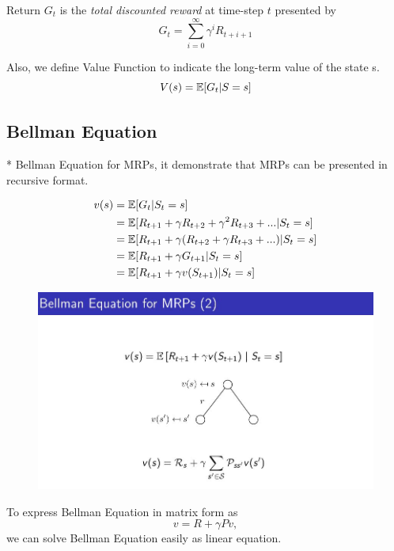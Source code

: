 \documentclass[10pt, a4paper, twocolumn]{article} %
\begin{document}
Return $G_{t}$ is the \textsl{total discounted reward} at time-step $t$ presented by $$G_{t} = \sum_{i = 0}^{\infty} \gamma^{i} R_{t+i+1}$$

Also, we define Value Function to indicate the long-term value of the state s. $$ V(s) = \Bbb{E} [G_{t} | S = s] $$

\subsection{Bellman Equation}

* Bellman Equation for MRPs, it demonstrate that MRPs can be presented in recursive format.


\begin{equation*}
	\begin{aligned}
		\displaystyle
		v(s) &= \Bbb{E} [G_{t} | S_{t} = s] \\
		&= \Bbb{E} [R_{t+1} + \gamma R_{t+2} + \gamma^{2} R_{t+3} + ... | S_{t} = s] \\
		&= \Bbb{E} [R_{t+1} + \gamma (R_{t+2} + \gamma R_{t+3} + ...) | S_{t} = s] \\
		&= \Bbb{E} [R_{t+1} + \gamma G_{t+1} | S_{t} = s]\\ 
		&= \Bbb{E} [R_{t+1} + \gamma v(S_{t+1}) | S_{t} = s]
	\end{aligned}
\end{equation*}

\begin{figure}
	\begin{centering}
		\includegraphics[width = \linewidth]{bellman.jpg}
	\end{centering}
\end{figure}

To express Bellman Equation in matrix form as $$v = R + \gamma P v,$$ we can solve Bellman Equation easily as linear equation.
\end{document}
